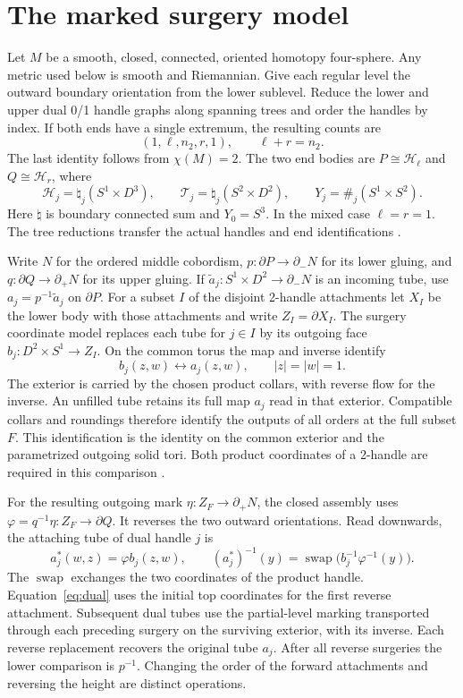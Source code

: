 \documentclass[11pt,letterpaper]{article}
\numberwithin{equation}{section}
\theoremstyle{remark}
\newcommand{\HB}[1]{\mathcal H_{#1}}
\newcommand{\TB}[1]{\mathcal T_{#1}}
\begin{document}
\section{The marked surgery model}\label{sec:mark}
Let \(M\) be a smooth, closed, connected, oriented homotopy
four-sphere. Any metric used below is smooth and Riemannian. Give
each regular level the outward boundary orientation from the lower
sublevel. Reduce the lower and upper dual 0/1 handle graphs along
spanning trees and order the handles by index. If both ends have a
single extremum, the resulting counts are
\[
 (1,\ell,n_2,r,1),\qquad \ell+r=n_2.
\]
The last identity follows from \(\chi(M)=2\). The two end bodies
are \(P\cong\HB{\ell}\) and \(Q\cong\HB{r}\), where
\[
 \HB{j}=\natural_j(S^1\times D^3),\qquad
 \TB{j}=\natural_j(S^2\times D^2),\qquad
 Y_j=\#_j(S^1\times S^2).
\]
Here \(\natural\) is boundary connected sum and \(Y_0=S^3\).
In the mixed case \(\ell=r=1\). The tree reductions transfer
the actual handles and end identifications
\cite[Lemma 4.7 and Theorem 4.8]{Milnor1965HCobordism}
\cite[marked end reductions]{Baker2026MarkedHeights}.

Write \(N\) for the ordered middle cobordism, \(p:\partial P\to
\partial_-N\) for its lower gluing, and \(q:\partial Q\to\partial_+N\)
for its upper gluing. If \(\widetilde a_j:S^1\times D^2\to\partial_-N\)
is an incoming tube, use \(a_j=p^{-1}\widetilde a_j\) on \(\partial P\).
For a subset \(I\) of the disjoint 2-handle attachments let \(X_I\) be
the lower body with those attachments and write \(Z_I=\partial X_I\).
The surgery coordinate model replaces each tube for \(j\in I\)
by its outgoing face \(b_j:D^2\times S^1\to Z_I\). On the common torus
the map and inverse identify
\[
 b_j(z,w)\longleftrightarrow a_j(z,w),\qquad |z|=|w|=1.
\]
The exterior is carried by the chosen product collars, with reverse
flow for the inverse. An unfilled tube retains its full map \(a_j\)
read in that exterior. Compatible collars and roundings therefore
identify the outputs of all orders at the full subset \(F\). This
identification is the identity on the common exterior and the
parametrized outgoing solid tori. Both product coordinates of a
2-handle are required in this comparison
\cite[quadratic handle model]{Baker2026ImmersedHandles}.

For the resulting outgoing mark \(\eta:Z_F\to\partial_+N\), the
closed assembly uses \(\varphi=q^{-1}\eta:Z_F\to\partial Q\). It
reverses the two outward orientations. Read downwards, the
attaching tube of dual handle \(j\) is
\begin{equation}\label{eq:dual}
 a_j^*(w,z)=\varphi b_j(z,w),\qquad
 (a_j^*)^{-1}(y)=\operatorname{swap}\bigl(b_j^{-1}\varphi^{-1}(y)\bigr).
\end{equation}
The \(\operatorname{swap}\) exchanges the two coordinates of the
product handle. Equation~\eqref{eq:dual} uses the initial top
coordinates for the first reverse attachment. Subsequent dual
tubes use the partial-level marking transported through each
preceding surgery on the surviving exterior, with its inverse.
Each reverse replacement recovers the original tube \(a_j\).
After all reverse surgeries the lower comparison is \(p^{-1}\).
Changing the order of the forward attachments and reversing the
height are distinct operations.
\end{document}
